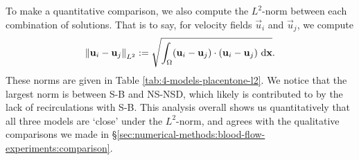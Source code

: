    To make a quantitative comparison, we also compute the $L^2$-norm between each combination of solutions. That is to say, for velocity fields $\vec{u}_i$ and $\vec{u}_j$, we compute
    \begin{equation}
        \norm{\boldsymbol{\mathbf{u}}_i - \boldsymbol{\mathbf{u}}_j}_{L^2} := \sqrt{\int_\Omega (\boldsymbol{\mathbf{u}}_i - \boldsymbol{\mathbf{u}}_j) \cdot (\boldsymbol{\mathbf{u}}_i - \boldsymbol{\mathbf{u}}_j) ~\mathrm{d} \boldsymbol{\mathbf{x}}}.
    \end{equation}
    These norms are given in Table \ref{tab:4-models-placentone-l2}. We notice that the largest norm is between S-B and NS-NSD, which likely is contributed to by the lack of recirculations with S-B. This analysis overall shows us quantitatively that all three models are `close' under the $L^2$-norm, and agrees with the qualitative comparisons we made in \S\ref{sec:numerical-methods:blood-flow-experiments:comparison}. 

